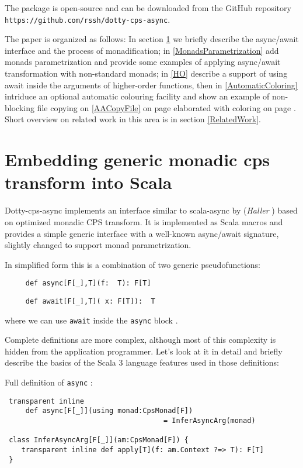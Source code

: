 \documentclass{llncs}
\begin{document}
  The package is open-source and can be downloaded from the GitHub repository {\small \verb|https://github.com/rssh/dotty-cps-async|}.
  
    The paper is organized as follows: In section  {\ref{EmbeddingGeneric}} we briefly describe the async/await interface and the process of monadification; in \ref{MonadsParametrization} add monads parametrization and provide some examples of applying async/await transformation with non-standard monads; in \ref{HO} describe a support of using await inside the arguments of higher-order functions, then in \ref{AutomaticColoring} intriduce an optional automatic colouring facility and show an example of non-blocking file copying on \ref{AACopyFile} on page \pageref{AACopyFile}  elaborated with coloring on page \pageref{AACopyFileAC}.  
    Short overview on related work in this area is in section \ref{RelatedWork}.

  
\section{ Embedding generic monadic cps transform into Scala  }  \label{EmbeddingGeneric}

Dotty-cps-async implements an interface similar to scala-async by ({\it Haller}  \cite{hallerScalaAsync}) based on optimized monadic CPS transform.  It is implemented as Scala macros and provides a simple generic interface with a well-known async/await signature, slightly changed to support monad parametrization.

In simplified form this is a combination of two generic pseudofunctions:

\begin{lstlisting}
     def async[F[_],T](f:  T): F[T] 
 \end{lstlisting}

\begin{lstlisting}
     def await[F[_],T]( x: F[T]):  T 
 \end{lstlisting}

where we can use \lstinline|await| inside the \lstinline|async| block .


Complete definitions are more complex, although  most of this complexity is hidden from the application programmer.
    Let's look at it in detail and briefly describe the basics of the Scala 3 language features used in those definitions:
 
 Full definition of \lstinline|async| :
    
\begin{lstlisting}
 transparent inline 
     def async[F[_]](using monad:CpsMonad[F])
                                      = InferAsyncArg(monad)
     
 class InferAsyncArg[F[_]](am:CpsMonad[F]) {
    transparent inline def apply[T](f: am.Context ?=> T): F[T] 
 }
 \end{lstlisting}
\end{document}
